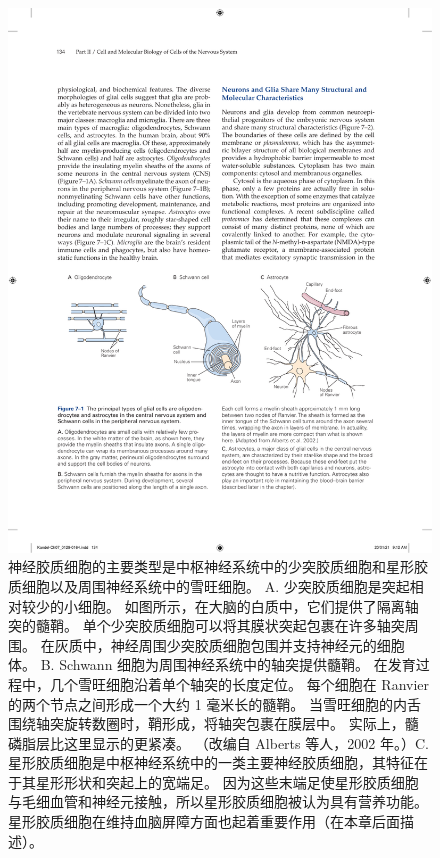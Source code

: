\begin{figure}[htbp]
	\centering
	\includegraphics[width=1.0\linewidth]{chap07/fig_7_1}
	\caption{神经胶质细胞的主要类型是中枢神经系统中的少突胶质细胞和星形胶质细胞以及周围神经系统中的雪旺细胞。 
		A. 少突胶质细胞是突起相对较少的小细胞。 
		如图所示，在大脑的白质中，它们提供了隔离轴突的髓鞘。 
		单个少突胶质细胞可以将其膜状突起包裹在许多轴突周围。 在灰质中，神经周围少突胶质细胞包围并支持神经元的细胞体。 B. Schwann 细胞为周围神经系统中的轴突提供髓鞘。 在发育过程中，几个雪旺细胞沿着单个轴突的长度定位。 每个细胞在 Ranvier 的两个节点之间形成一个大约 1 毫米长的髓鞘。 当雪旺细胞的内舌围绕轴突旋转数圈时，鞘形成，将轴突包裹在膜层中。 实际上，髓磷脂层比这里显示的更紧凑。 （改编自 Alberts 等人，2002 年。）C. 星形胶质细胞是中枢神经系统中的一类主要神经胶质细胞，其特征在于其星形形状和突起上的宽端足。 因为这些末端足使星形胶质细胞与毛细血管和神经元接触，所以星形胶质细胞被认为具有营养功能。 星形胶质细胞在维持血脑屏障方面也起着重要作用（在本章后面描述）。}
	\label{fig:7_1}
\end{figure}


